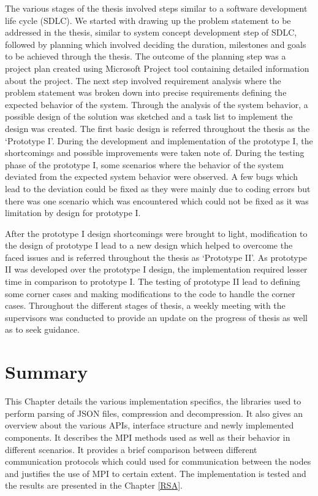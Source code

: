 The various stages of the thesis involved steps similar to a software development life cycle (SDLC). We started with drawing up the problem statement to be addressed in the thesis, similar to system concept development step of SDLC, followed by planning which involved deciding the duration, milestones and goals to be achieved through the thesis. The outcome of the planning step was a project plan created using Microsoft Project tool containing detailed information about the project. The next step involved requirement analysis where the problem statement was broken down into precise requirements defining the expected behavior of the system. Through the analysis of the system behavior, a possible design of the solution was sketched and a task list to implement the design was created. The first basic design is referred throughout the thesis as the {\lq}Prototype I{\rq}. During the development and implementation of the prototype I, the shortcomings and possible improvements were taken note of. During the testing phase of the prototype I, some scenarios where the behavior of the system deviated from the expected system behavior were observed. A few bugs which lead to the deviation could be fixed as they were mainly due to coding errors but there was one scenario which was encountered which could not be fixed as it was limitation by design for prototype I. \newline

After the prototype I design shortcomings were brought to light, modification to the design of prototype I lead to a new design which helped to overcome the faced issues and is referred throughout the thesis as {\lq}Prototype II{\rq}. As prototype II was developed over the prototype I design, the implementation required lesser time in comparison to prototype I. The testing of prototype II lead to defining some corner cases and making modifications to the code to handle the corner cases. Throughout the different stages of thesis, a weekly meeting with the supervisors was conducted to provide an update on the progress of thesis as well as to seek guidance.

\section{Summary}

This Chapter details the various implementation specifics, the libraries used to perform parsing of JSON files, compression and decompression. It also gives an overview about the various APIs, interface structure and newly implemented components. It describes the MPI methods used as well as their behavior in different scenarios. It provides a brief comparison between different communication protocols which could used for communication between the nodes and justifies the use of MPI to certain extent. The implementation is tested and the results are presented in the Chapter \ref{RSA}. 
